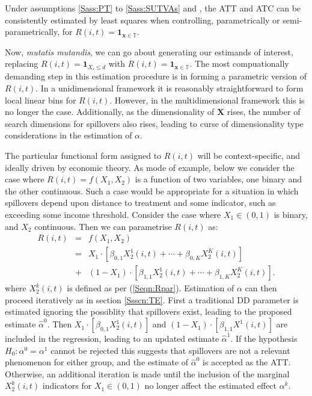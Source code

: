 \begin{proposition}
\label{Pass:ATTnonP}
Under assumptions \ref{Sass:PT} to \ref{Sass:SUTVAs} and
, the ATT and ATC can be consistently estimated
by least squares when controlling, parametrically or
semi-parametrically, for $R(i,t)=\mathbf{1}_{\mathbf{x}\in
  \mathbb{T}}$. 
\end{proposition}

Now, \emph{mutatis mutandis}, we can go about generating our estimands of
interest, replacing $R(i,t)=\mathbf{1}_{X_i\leq d}$ with
$R(i,t)=\mathbf{1}_{\mathbf{x}\in \mathbb{T}}$.  The most compuationally
demanding step in this estimation procedure is in forming a parametric
version of $R(i,t)$.  In a unidimensional framework it is reasonably straightforward
to form local linear bins for $R(i,t)$.  However, in the multidimensional framework
this is no longer the case.  Additionally, as the dimensionality of $\mathbf{X}$
rises, the number of search dimensions for spillovers also rises, leading to 
curse of dimensionality type considerations in the estimation of $\alpha$.

The particular functional form assigned to $R(i,t)$ will be context-specific,
and ideally driven by economic theory.  As mode of example, below we consider the
case where $R(i,t)=f(X_1,X_2)$ is a function of two variables, one binary and
the other continuous.  Such a case would be appropriate for a situation in which
spillovers depend upon distance to treatment and some indicator, such as exceeding
some income threshold.  Consider the case where $X_1\in (0,1)$ is binary, and 
$X_2$ continuous.  Then we can parametrise $R(i,t)$ as:
\begin{eqnarray}
R(i,t)&=&f(X_1,X_2) \nonumber \\
      &=&X_1\cdot[\beta_{0,1}X_2^1(i,t)+ \cdots + \beta_{0,K}X_2^K(i,t)] \nonumber \\
      &+& (1-X_1)\cdot[\beta_{1,1}X_2^1(i,t)+ \cdots + \beta_{1,K}X_2^K(i,t)]. \nonumber
\end{eqnarray}
where $X_2^k(i,t)$ is defined as per (\ref{Seqn:Rpar}).  Estimation of $\alpha$ 
can then proceed iteratively as in section \ref{Ssscn:TE}.  First a traditional 
DD parameter is estimated ignoring the possiblity that spillovers exist, leading 
to the proposed estimate $\hat\alpha^0$.  Then $X_1\cdot[\beta_{0,1}X_2^1(i,t)]$ 
and $(1-X_1)\cdot[\beta_{1,1}X^1(i,t)]$ are included in the regression, leading to 
an updated estimate $\hat\alpha^1$.  If the hypothesis $H_0: \alpha^0=\alpha^1$ 
cannot be rejected this suggests that spillovers are not a relevant phenomenon 
for either group, and the estimate of $\hat\alpha^0$ is accepted as the ATT.  
Otherwise, an additional iteration is made until the inclusion of the marginal 
$X_2^k(i,t)$ indicators for $X_1 \in (0,1)$ no longer affect the estimated effect 
$\alpha^k$.

